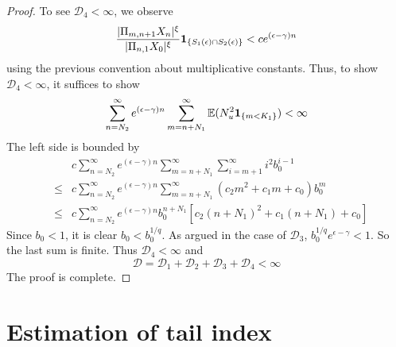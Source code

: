 \begin{proof}
To see $\mathscr D_4 < \infty$, we observe
\[
  {
    |\Pi_{m, n+1} X_n |^{\xi}
    \over
    |\Pi_{n, 1} X_0 |^{\xi}        
  } \mathbf{1}_{\{S_1(\epsilon) \cap S_2(\epsilon)\}}
  <
  c e^{(\epsilon - \gamma) n} 
\]
using the previous convention about multiplicative constants. Thus, to
show $\mathscr D_4 < \infty$, it suffices to show
\[
\sum_{n=N_2}^\infty
e^{(\epsilon - \gamma) n} 
\sum_{m=n+N_1}^\infty
\mathbb{E} (N_u^2 \mathbf{1}_{\{m < K_1\}}) < \infty
\]
The left side is bounded by
\begin{eqnarray*}
  &&
  c \sum_{n=N_2}^\infty
  e^{(\epsilon - \gamma) n} 
  \sum_{m=n+N_1}^\infty
  \sum_{i=m+1}^\infty
  i^2 b_0^{i-1} \\
  &\leq&
  c \sum_{n=N_2}^\infty
  e^{(\epsilon - \gamma) n}   
  \sum_{m=n+N_1}^\infty
  (c_2 m^2 + c_1 m + c_0) b_0^m \\
  &\leq&
  c \sum_{n=N_2}^\infty
  e^{(\epsilon - \gamma) n} b_0^{n + N_1}
  [c_2 (n + N_1)^2 + c_1 (n + N_1) + c_0]
\end{eqnarray*}
Since $b_0 < 1$, it is clear $b_0 < b_0^{1/q}$.
As argued in the case of $\mathscr D_3$,
$b_0^{1/q} e^{\epsilon - \gamma} < 1$. So the last sum is finite.
Thus $\mathscr D_4 < \infty$ and
\[
\mathscr D
=
\mathscr D_1 + \mathscr D_2 + \mathscr D_3 + \mathscr D_4
< \infty
\]
The proof is complete.
\end{proof}

\section[Estimation of tail index]{Estimation of tail index}
